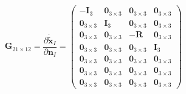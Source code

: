 \documentclass[12pt,a4paper]{article}
\begin{document}
\begin{equation*}
\mathbf{G}_{21 \times 12} = 
\frac{\partial \dot{\tilde{\mathbf{x}}}_I}{\partial \mathbf{n}_I} = 
\begin{pmatrix}
-\mathbf{I}_3 & \mathbf{0}_{3\times 3} & \mathbf{0}_{3\times 3} & \mathbf{0}_{3\times 3} \\
\mathbf{0}_{3\times 3} & \mathbf{I}_3 &  \mathbf{0}_{3\times 3} & \mathbf{0}_{3\times 3} \\
\mathbf{0}_{3\times 3} & \mathbf{0}_{3\times 3} & -\mathbf{R} & \mathbf{0}_{3\times 3} \\
\mathbf{0}_{3\times 3} & \mathbf{0}_{3\times 3} & \mathbf{0}_{3\times 3} & \mathbf{I}_3 \\
\mathbf{0}_{3\times 3} & \mathbf{0}_{3\times 3} & \mathbf{0}_{3\times 3} & \mathbf{0}_{3\times 3} \\
\mathbf{0}_{3\times 3} & \mathbf{0}_{3\times 3} & \mathbf{0}_{3\times 3} & \mathbf{0}_{3\times 3} \\
\mathbf{0}_{3\times 3} & \mathbf{0}_{3\times 3} & \mathbf{0}_{3\times 3} & \mathbf{0}_{3\times 3}
\end{pmatrix}
\end{equation*}



\end{document}
